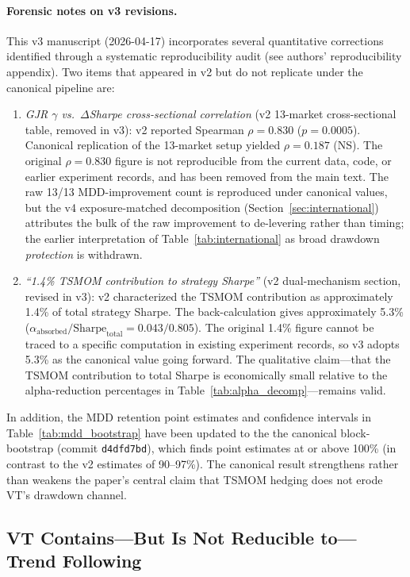 \paragraph{Forensic notes on v3 revisions.} This v3 manuscript (2026-04-17) incorporates several quantitative corrections identified through a systematic reproducibility audit (see authors' reproducibility appendix). Two items that appeared in v2 but do not replicate under the canonical pipeline are:
\begin{enumerate}
\item \emph{GJR $\gamma$ vs.\ $\Delta$Sharpe cross-sectional correlation} (v2 13-market cross-sectional table, removed in v3): v2 reported Spearman $\rho = 0.830$ ($p = 0.0005$). Canonical replication of the 13-market setup yielded $\rho = 0.187$ (NS). The original $\rho = 0.830$ figure is not reproducible from the current data, code, or earlier experiment records, and has been removed from the main text. The raw 13/13 MDD-improvement count is reproduced under canonical values, but the v4 exposure-matched decomposition (Section~\ref{sec:international}) attributes the bulk of the raw improvement to de-levering rather than timing; the earlier interpretation of Table~\ref{tab:international} as broad drawdown \emph{protection} is withdrawn.
\item \emph{``1.4\% TSMOM contribution to strategy Sharpe''} (v2 dual-mechanism section, revised in v3): v2 characterized the TSMOM contribution as approximately 1.4\% of total strategy Sharpe. The back-calculation gives approximately 5.3\% ($\alpha_{\text{absorbed}}/\text{Sharpe}_{\text{total}} = 0.043/0.805$). The original 1.4\% figure cannot be traced to a specific computation in existing experiment records, so v3 adopts 5.3\% as the canonical value going forward. The qualitative claim---that the TSMOM contribution to total Sharpe is economically small relative to the alpha-reduction percentages in Table~\ref{tab:alpha_decomp}---remains valid.
\end{enumerate}
In addition, the MDD retention point estimates and confidence intervals in Table~\ref{tab:mdd_bootstrap} have been updated to the the canonical block-bootstrap (commit \texttt{d4dfd7bd}), which finds point estimates at or above 100\% (in contrast to the v2 estimates of 90--97\%). The canonical result strengthens rather than weakens the paper's central claim that TSMOM hedging does not erode VT's drawdown channel.

\subsection{VT Contains---But Is Not Reducible to---Trend Following}

